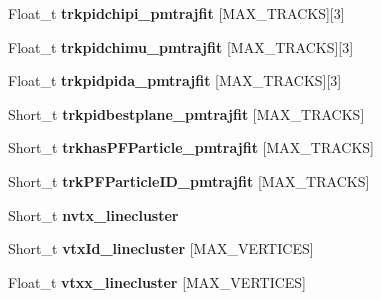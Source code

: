 \begin{DoxyCompactItemize}
\item 
\hypertarget{classanatree_a2487641b188b3ff39acbd6165a77b4f1}{Float\-\_\-t {\bfseries trkpidchipi\-\_\-pmtrajfit} \mbox{[}M\-A\-X\-\_\-\-T\-R\-A\-C\-K\-S\mbox{]}\mbox{[}3\mbox{]}}\label{classanatree_a2487641b188b3ff39acbd6165a77b4f1}

\item 
\hypertarget{classanatree_ad41d442e1477f440a9f3fcb58ecf75f0}{Float\-\_\-t {\bfseries trkpidchimu\-\_\-pmtrajfit} \mbox{[}M\-A\-X\-\_\-\-T\-R\-A\-C\-K\-S\mbox{]}\mbox{[}3\mbox{]}}\label{classanatree_ad41d442e1477f440a9f3fcb58ecf75f0}

\item 
\hypertarget{classanatree_a08f534ef3bcf5ffe47fe7382a521b5bb}{Float\-\_\-t {\bfseries trkpidpida\-\_\-pmtrajfit} \mbox{[}M\-A\-X\-\_\-\-T\-R\-A\-C\-K\-S\mbox{]}\mbox{[}3\mbox{]}}\label{classanatree_a08f534ef3bcf5ffe47fe7382a521b5bb}

\item 
\hypertarget{classanatree_ae7cc9eb4cbf68978ab8bbf7da5ff916a}{Short\-\_\-t {\bfseries trkpidbestplane\-\_\-pmtrajfit} \mbox{[}M\-A\-X\-\_\-\-T\-R\-A\-C\-K\-S\mbox{]}}\label{classanatree_ae7cc9eb4cbf68978ab8bbf7da5ff916a}

\item 
\hypertarget{classanatree_a0001ea589d625af0a469d81ac4ab354d}{Short\-\_\-t {\bfseries trkhas\-P\-F\-Particle\-\_\-pmtrajfit} \mbox{[}M\-A\-X\-\_\-\-T\-R\-A\-C\-K\-S\mbox{]}}\label{classanatree_a0001ea589d625af0a469d81ac4ab354d}

\item 
\hypertarget{classanatree_a3b82c4cb8ab4a905b058baadd1533346}{Short\-\_\-t {\bfseries trk\-P\-F\-Particle\-I\-D\-\_\-pmtrajfit} \mbox{[}M\-A\-X\-\_\-\-T\-R\-A\-C\-K\-S\mbox{]}}\label{classanatree_a3b82c4cb8ab4a905b058baadd1533346}

\item 
\hypertarget{classanatree_ae8a9245846fa5bf357860f3ab6a17c5c}{Short\-\_\-t {\bfseries nvtx\-\_\-linecluster}}\label{classanatree_ae8a9245846fa5bf357860f3ab6a17c5c}

\item 
\hypertarget{classanatree_a767a1b4ace99de6ac95968bbe5fb3f8d}{Short\-\_\-t {\bfseries vtx\-Id\-\_\-linecluster} \mbox{[}M\-A\-X\-\_\-\-V\-E\-R\-T\-I\-C\-E\-S\mbox{]}}\label{classanatree_a767a1b4ace99de6ac95968bbe5fb3f8d}

\item 
\hypertarget{classanatree_ae231dc3326af03fc901759bcb6c39f5c}{Float\-\_\-t {\bfseries vtxx\-\_\-linecluster} \mbox{[}M\-A\-X\-\_\-\-V\-E\-R\-T\-I\-C\-E\-S\mbox{]}}\label{classanatree_ae231dc3326af03fc901759bcb6c39f5c}


\end{DoxyCompactItemize}

